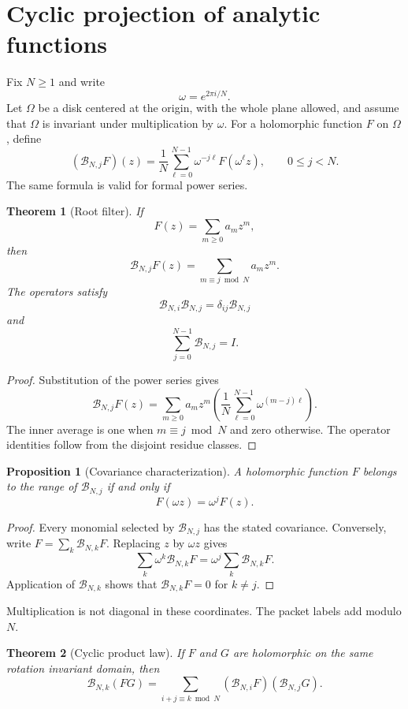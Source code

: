 \documentclass{aomart}
\newtheorem{theorem}{Theorem}[section]
\newtheorem{proposition}[proposition]{Proposition}
\theoremstyle{definition}
\theoremstyle{remark}
\newcommand{\Bcal}{\mathcal B}
\begin{document}
\section{Cyclic projection of analytic functions}\label{sec:cyclic_projection}

Fix $N\geq1$ and write
\[
\omega=e^{2\pi i/N}.
\]
Let $\Omega$ be a disk centered at the origin, with the whole plane allowed, and assume that $\Omega$ is invariant under multiplication by $\omega$.  For a holomorphic function $F$ on $\Omega$, define
\[
(\Bcal_{N,j}F)(z)
=
\frac1N\sum_{\ell=0}^{N-1}\omega^{-j\ell}F(\omega^\ell z),
\qquad 0\leq j<N.
\]
The same formula is valid for formal power series.

\begin{theorem}[Root filter]\label{thm:root_filter}
If
\[
F(z)=\sum_{m\geq0}a_mz^m,
\]
then
\[
\Bcal_{N,j}F(z)
=
\sum_{m\equiv j\bmod N}a_mz^m.
\]
The operators satisfy
\[
\Bcal_{N,i}\Bcal_{N,j}=\delta_{ij}\Bcal_{N,j}
\]
and
\[
\sum_{j=0}^{N-1}\Bcal_{N,j}=I.
\]
\end{theorem}

\begin{proof}
Substitution of the power series gives
\[
\Bcal_{N,j}F(z)
=
\sum_{m\geq0}a_mz^m
\left(
\frac1N\sum_{\ell=0}^{N-1}\omega^{(m-j)\ell}
\right).
\]
The inner average is one when $m\equiv j\bmod N$ and zero otherwise.  The operator identities follow from the disjoint residue classes.
\end{proof}

\begin{proposition}[Covariance characterization]\label{prop:covariance}
A holomorphic function $F$ belongs to the range of $\Bcal_{N,j}$ if and only if
\[
F(\omega z)=\omega^jF(z).
\]
\end{proposition}

\begin{proof}
Every monomial selected by $\Bcal_{N,j}$ has the stated covariance.  Conversely, write $F=\sum_k\Bcal_{N,k}F$.  Replacing $z$ by $\omega z$ gives
\[
\sum_k\omega^k\Bcal_{N,k}F
=
\omega^j\sum_k\Bcal_{N,k}F.
\]
Application of $\Bcal_{N,k}$ shows that $\Bcal_{N,k}F=0$ for $k\ne j$.
\end{proof}

Multiplication is not diagonal in these coordinates.  The packet labels add modulo $N$.

\begin{theorem}[Cyclic product law]\label{thm:cyclic_product}
If $F$ and $G$ are holomorphic on the same rotation invariant domain, then
\[
\Bcal_{N,k}(FG)
=
\sum_{i+j\equiv k\bmod N}
(\Bcal_{N,i}F)(\Bcal_{N,j}G).
\]
\end{theorem}
\end{document}
